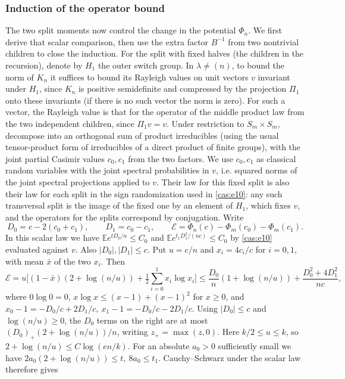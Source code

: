 \subsubsection{Induction of the operator bound}

The two split moments now control the change in the potential
$\Phi_n$.  We first derive that scalar comparison, then use the extra
factor $B^{-1}$ from two nontrivial children to close the induction.
For the split with fixed halves (the children in the recursion), denote by \(H_1\) the outer switch group. In \(\lambda\ne(n)\), to bound the norm of \(K_n\) it suffices to bound its Rayleigh values on unit vectors \(v\) invariant under \(H_1\), since \(K_n\) is positive semidefinite and compressed by the projection \(\Pi_1\) onto these invariants (if there is no such vector the norm is zero). For such a vector, the Rayleigh value is that for the operator of the middle product law from the two independent children, since \(\Pi_1 v=v\). Under restriction to \(S_m\times S_m\), decompose into an orthogonal sum of product irreducibles (using the usual tensor-product form of irreducibles of a direct product of finite groups), with the joint partial Casimir values \(c_0,c_1\) from the two factors. We use \(c_0,c_1\) as classical random variables with the joint spectral probabilities in \(v\), i.e. squared norms of the joint spectral projections applied to \(v\). Their law for this fixed split is also their law for each split in the sign randomization used in \eqref{cas:e10}: any such transversal split is the image of the fixed one by an element of \(H_1\), which fixes \(v\), and the operators for the splits correspond by conjugation. Write
\[
D_0=c-2(c_0+c_1),\qquad D_1=c_0-c_1,\qquad
\mathcal E=\Phi_n(c)-\Phi_m(c_0)-\Phi_m(c_1).
\]
In this scalar law we have \(\mathbb E e^{tD_0/n}\le C_0\) and \(\mathbb E e^{t_1 D_1^2/(nc)}\le C_0\) by \eqref{cas:e10} evaluated against \(v\). Also \(|D_0|,|D_1|\le c\). Put \(u=c/n\) and \(x_i=4 c_i/c\) for \(i=0,1\), with mean \(\bar x\) of the two \(x_i\). Then
\[
\mathcal E=u\big[(1-\bar x)(2+\log(n/u))+\tfrac12\textstyle\sum_{i=0}^1 x_i\log x_i\big]
\le \frac{D_0}{n}(1+\log(n/u))+\frac{D_0^2+4D_1^2}{n c},
\]
where \(0\log0=0\), \(x\log x\le (x-1)+(x-1)^2\) for \(x\ge0\), and \(x_0-1=-D_0/c+2D_1/c,\ x_1-1=-D_0/c-2D_1/c\). Using \(|D_0|\le c\) and \(\log(n/u)\ge0\), the \(D_0\) terms on the right are at most \((D_0)_+(2+\log(n/u))/n\), writing \(z_+=\max(z,0)\). Here \(k/2\le u\le k\), so \(2+\log(n/u)\le C\log(e n/k)\). For an absolute \(a_0>0\) sufficiently small we have \(2a_0(2+\log(n/u))\le t,\ 8a_0\le t_1\). Cauchy--Schwarz under the scalar law therefore gives

